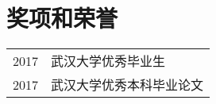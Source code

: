\section*{奖项和荣誉}

\begin{tabular}{p{} p{}}
2017 & 武汉大学优秀毕业生 \\
2017 & 武汉大学优秀本科毕业论文 \\
\end{tabular}
